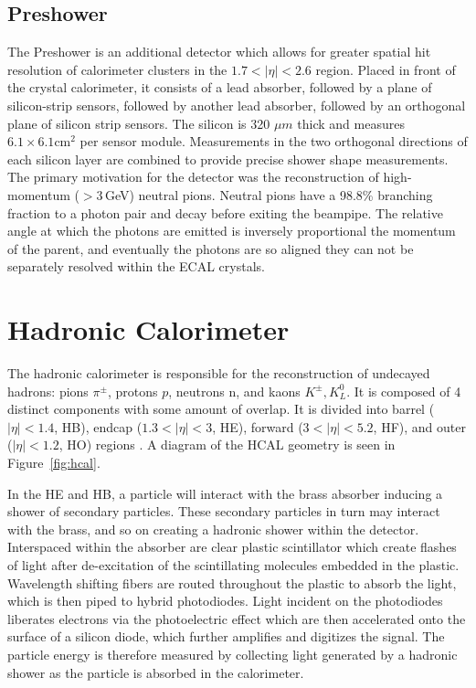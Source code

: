 \subsection{Preshower}

The Preshower is an additional detector which allows for greater spatial hit resolution of calorimeter clusters in the $1.7<|\eta|<2.6$ region. Placed in front of the crystal calorimeter, it consists of a lead absorber, followed by a plane of silicon-strip sensors, followed by another lead absorber, followed by an orthogonal plane of silicon strip sensors. The silicon is 320 $\mu m$ thick and measures $6.1\times6.1 \textrm{cm}^{2}$ per sensor module. Measurements in the two orthogonal directions of each silicon layer are combined to provide precise shower shape measurements. The primary motivation for the detector was the reconstruction of high-momentum ($>3\,$GeV) neutral pions. Neutral pions have a 98.8\% branching fraction to a photon pair and decay before exiting the beampipe. The relative angle at which the photons are emitted is inversely proportional the momentum of the parent, and eventually the photons are so aligned they can not be separately resolved within the ECAL crystals.

\section{Hadronic Calorimeter}

The hadronic calorimeter is responsible for the reconstruction of undecayed hadrons: pions $\pi^{\pm}$, protons $p$, neutrons n, and kaons $K^{\pm}, K^{0}_{L}$. It is composed of 4 distinct components with some amount of overlap. It is divided into barrel ($|\eta|<1.4$, HB), endcap ($1.3<|\eta|<3$, HE), forward ($3<|\eta|<5.2$, HF), and outer ($|\eta|<1.2$, HO) regions  \cite{hcaltdr}. A diagram of the HCAL geometry is seen in Figure~\ref{fig:hcal}.

In the HE and HB, a particle will interact with the brass absorber inducing a shower of secondary particles. These secondary particles in turn may interact with the brass, and so on creating a hadronic shower within the detector. Interspaced within the absorber are clear plastic scintillator which create flashes of light after de-excitation of the scintillating molecules embedded in the plastic. Wavelength shifting fibers are routed throughout the plastic to absorb the light, which is then piped to hybrid photodiodes. Light incident on the photodiodes liberates electrons via the photoelectric effect which are then accelerated onto the surface of a silicon diode, which further amplifies and digitizes the signal. The particle energy is therefore measured by collecting light generated by a hadronic shower as the particle is absorbed in the calorimeter.

